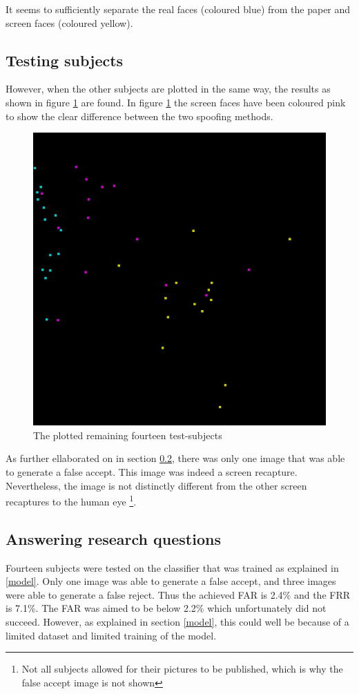 \documentclass{sig-alternate-br}
\begin{document}
It seems to sufficiently separate the real faces (coloured blue) from the paper and screen faces (coloured yellow).

\subsection{Testing subjects} \label{tests}
However, when the other subjects are plotted in the same way, the results as shown in figure \ref{fig:tests} are found. In figure \ref{fig:tests} the screen faces have been coloured pink to show the clear difference between the two spoofing methods.

\begin{figure}[h]
	\includegraphics[scale=0.2]{tests}
	\caption{The plotted remaining fourteen test-subjects}
	\label{fig:tests}
\end{figure}

As further ellaborated on in section \ref{stats}, there was only one image that was able to generate a false accept. This image was indeed a screen recapture. Nevertheless, the image is not distinctly different from the other screen recaptures to the human eye \footnote{Not all subjects allowed for their pictures to be published, which is why the false accept image is not shown}.

\subsection{Answering research questions} \label{stats}
Fourteen subjects were tested on the classifier that was trained as explained in \ref{model}. Only one image was able to generate a false accept, and three images were able to generate a false reject. Thus the achieved FAR is 2.4\% and the FRR is 7.1\%. The FAR was aimed to be below 2.2\% which unfortunately did not succeed. However, as explained in section \ref{model}, this could well be because of a limited dataset and limited training of the model.
\end{document}
